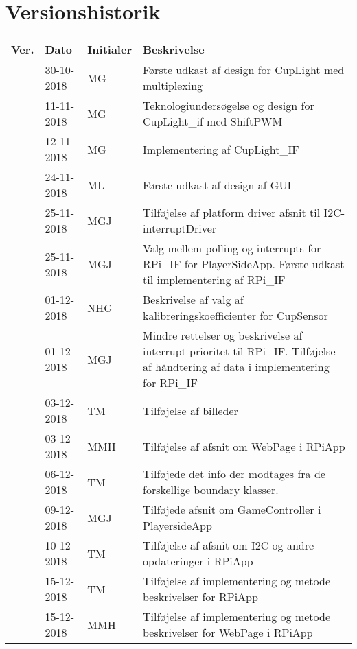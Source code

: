 \documentclass[Softwaredesign/Softwaredesign_main.tex]{subfiles}
\begin{document}
\section{Versionshistorik}
\begin{longtable}{|L{0.07\textwidth}|L{0.15\textwidth}|L{0.13\textwidth}|L{0.55\textwidth}|}
        \hline
        \textbf{Ver.} & \textbf{Dato} & \textbf{Initialer} & \textbf{Beskrivelse}  \\ \hline
         & 30-10-2018 & MG &  Første udkast af design for CupLight med multiplexing\\ \hline
         & 11-11-2018 & MG &  Teknologiundersøgelse og design for CupLight\_if med ShiftPWM\\ \hline
         & 12-11-2018 & MG &  Implementering af CupLight\_IF\\ \hline
         & 24-11-2018 & ML & Første udkast af design af GUI \\ \hline
         & 25-11-2018 & MGJ & Tilføjelse af platform driver afsnit til I2C-interruptDriver \\ \hline
         & 25-11-2018 & MGJ & Valg mellem polling og interrupts for RPi\_IF for PlayerSideApp. Første udkast til implementering  af RPi\_IF \\ \hline
         & 01-12-2018 & NHG & Beskrivelse af valg af kalibreringskoefficienter for CupSensor \\ \hline 
         & 01-12-2018 & MGJ & Mindre rettelser og beskrivelse af interrupt prioritet til RPi\_IF. Tilføjelse af håndtering af data i implementering for RPi\_IF \\ \hline
         & 03-12-2018 & TM & Tilføjelse af billeder \\ \hline
         & 03-12-2018 & MMH & Tilføjelse af afsnit om WebPage i RPiApp \\ \hline
         & 06-12-2018 & TM & Tilføjede det info der modtages fra de forskellige boundary klasser. \\ \hline
         & 09-12-2018 & MGJ & Tilføjede afsnit om GameController i PlayersideApp \\ \hline
         & 10-12-2018 & TM & Tilføjelse af afsnit om I2C og andre opdateringer i RPiApp \\ \hline
         & 15-12-2018 & TM & Tilføjelse af implementering og metode beskrivelser for RPiApp \\ \hline
         & 15-12-2018 & MMH & Tilføjelse af implementering og metode beskrivelser for WebPage i RPiApp \hline
\end{longtable}
\end{document}
